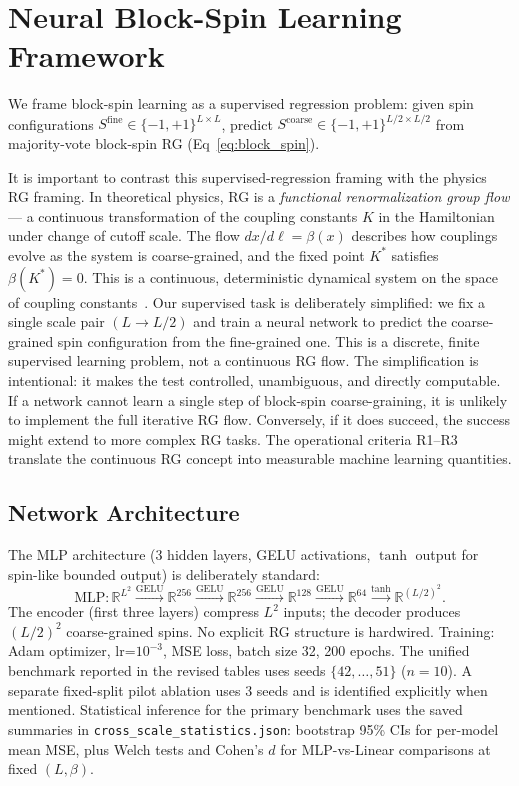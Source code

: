 \documentclass[12pt,a4paper]{memoir}
\def\reals{{\mathbb R}}
\begin{document}
\section{Neural Block-Spin Learning Framework}
\label{sec:framework}

We frame block-spin learning as a supervised regression problem:
given spin configurations $S^{\mathrm{fine}} \in \{-1,+1\}^{L\times L}$,
predict $S^{\mathrm{coarse}} \in \{-1,+1\}^{L/2\times L/2}$ from majority-vote
block-spin RG (Eq~\eqref{eq:block_spin}).

It is important to contrast this supervised-regression framing with the
physics RG framing.  In theoretical physics, RG is a \emph{functional
renormalization group flow} --- a continuous transformation of the coupling
constants $K$ in the Hamiltonian under change of cutoff scale.  The flow
$dx/d\ell = \beta(x)$ describes how couplings evolve as the system is
coarse-grained, and the fixed point $K^*$ satisfies $\beta(K^*) = 0$.  This
is a continuous, deterministic dynamical system on the space of coupling
constants~\citep{wilson1974renormalization,wilson1975,goldenfeld1992,zinn2021}.
Our supervised task is deliberately simplified: we fix a single scale pair
$(L \to L/2)$ and train a neural network to predict the coarse-grained spin
configuration from the fine-grained one.  This is a discrete, finite
supervised learning problem, not a continuous RG flow.  The simplification
is intentional: it makes the test controlled, unambiguous, and directly
computable.  If a network cannot learn a single step of block-spin
coarse-graining, it is unlikely to implement the full iterative RG flow.
Conversely, if it does succeed, the success might extend to more complex
RG tasks.  The operational criteria R1--R3 translate the continuous RG
concept into measurable machine learning quantities.

\subsection{Network Architecture}

The MLP architecture (3 hidden layers, GELU activations, $\tanh$ output for
spin-like bounded output) is deliberately standard:
\begin{equation}
    \text{MLP}: \reals^{L^2} \xrightarrow{\text{GELU}} \reals^{256}
    \xrightarrow{\text{GELU}} \reals^{256}
    \xrightarrow{\text{GELU}} \reals^{128}
    \xrightarrow{\text{GELU}} \reals^{64}
    \xrightarrow{\tanh} \reals^{(L/2)^2}.
    \label{eq:arch}
\end{equation}
The encoder (first three layers) compress $L^2$ inputs; the decoder
produces $(L/2)^2$ coarse-grained spins.  No explicit RG structure is
hardwired.  Training: Adam optimizer, lr=$10^{-3}$, MSE loss,
batch size 32, 200 epochs.  The unified benchmark reported in the revised
tables uses seeds $\{42,\dots,51\}$ ($n=10$).  A separate fixed-split pilot
ablation uses 3 seeds and is identified explicitly when mentioned.  Statistical
inference for the primary benchmark uses the saved summaries in
\texttt{cross\_scale\_statistics.json}: bootstrap 95\% CIs for per-model mean
MSE, plus Welch tests and Cohen's $d$ for MLP-vs-Linear comparisons at fixed
$(L,\beta)$.
\end{document}
